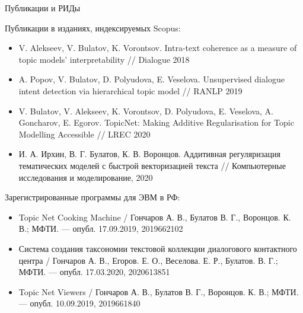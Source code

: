 \begin{frame}[t]{Публикации и РИДы}
\footnotesize

Публикации в изданиях, индексируемых Scopus:
\begin{itemize}
    \smallskip\item  V. Alekseev, V. Bulatov, K. Vorontsov. Intra-text coherence as a measure of topic models’ interpretability  // Dialogue 2018

    \smallskip\item A. Popov, V. Bulatov, D. Polyudova, E. Veselova. Unsupervised dialogue intent detection via hierarchical topic model // RANLP 2019

    \smallskip\item V. Bulatov, V. Alekseev, K. Vorontsov, D. Polyudova, E. Veselova, A. Goncharov, E. Egorov. TopicNet: Making Additive Regularisation for Topic Modelling Accessible // LREC 2020

    \smallskip\item\color{red} И. А. Ирхин, В. Г. Булатов, К. В. Воронцов. Аддитивная регуляризация тематических моделей с быстрой векторизацией текста // Компьютерные исследования и моделирование, 2020
\end{itemize}

Зарегистрированные программы для ЭВМ в РФ:
\begin{itemize}
    \smallskip\item  Topic Net Cooking Machine  / Гончаров А. В., Булатов В. Г., Воронцов. К. В.; МФТИ. --- опубл. 17.09.2019, 2019662102

    \smallskip\item Система создания таксономии текстовой коллекции диалогового контактного центра / Гончаров А. В., Егоров. Е. О., Веселова. Е. Р., Булатов. В. Г.; МФТИ. --- опубл. 17.03.2020, 2020613851

    \smallskip\item Topic Net Viewers  / Гончаров А. В., Булатов В. Г., Воронцов. К. В.; МФТИ. --- опубл. 10.09.2019, 2019661840

\end{itemize}

\normalsize
\end{frame}
